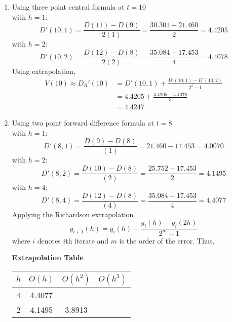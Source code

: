 \documentclass[12pt,class=book,crop=false]{standalone}
\begin{document}
\begin{soln}
    \begin{enumerate}[label=(\alph*)]
        \item Using three point central formula at $ t = 10 $\\
              \indent with $ h = 1 $:
              \[
                  D'(10,1)=\frac{D(11)-D(9)}{2(1)}=\frac{30.301-21.460}{2}=4.4205
              \]
              \indent with $ h = 2 $:
              \[
                  D' (10,2)=\frac{D(12)-D(8)}{2(2)}=\frac{35.084-17.453}{4}= 4.4078
              \]
              Using extrapolation,
              \begin{align*}
                  V(10)\approx D_R' (10) & =D'(10,1)+\frac{D' (10,1)-D' (10,2)}{2^2-1} \\
                                         & =4.4205+\frac{4.4205-4.4078}{3}             \\
                                         & = 4.4247
              \end{align*}
        \item Using two point forward difference formula at $ t = 8 $\\
              \indent with $ h = 1 $:
              \[
                  D' (8,1)=\frac{D(9)-D(8)}{(1)}=21.460-17.453 = 4.0070
              \]
              \indent with $ h = 2 $:
              \[
                  D' (8,2)=\frac{D(10)-D(8)}{(2)}=\frac{25.752-17.453}{2}= 4.1495
              \]
              \indent with $ h = 4 $:
              \[
                  D' (8,4)=\frac{D(12)-D(8)}{(4)}=\frac{35.084-17.453}{4}= 4.4077
              \]
              Applying the Richardson extrapolation
              \[
                  g_{i+1} (h)=g_i (h)+\frac{g_i (h)-g_i (2h)}{2^m-1}
              \]
              where $ i $ denotes $ i $th iterate and $ m $ is the order of the error. Thus,
              \begin{table}[H]
                  \centering
                  \textbf{Extrapolation Table\\}
                  \begin{tabular}{c*{3}{S[table-format=2.4]}}
                      \toprule
                      $ h $ &  &  &  \\     & 4.4077   &            &            \\
                      2     & 4.1495   & 3.8913     &            \\

\end{tabular}
\end{table}
\end{enumerate}
\end{soln}
\end{document}
